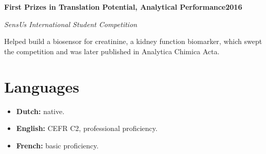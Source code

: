 \documentclass[10pt]{scrartcl}
\newcommand{\cventry}[4]{%
    \needspace{5\baselineskip}%
    {\large\textbf{#1}}\hfill\textbf{#3}\par
    \textit{#2}\par
    \smallskip
    #4\par
    \medskip
}
\begin{document}
\cventry
    {First Prizes in Translation Potential, Analytical Performance}
    {SensUs International Student Competition}
    {2016}
    {Helped build a biosensor for creatinine, a kidney function biomarker, which swept the competition and was later published in Analytica Chimica Acta.}

\section{Languages}

\begin{itemize}
    \item \textbf{Dutch:} native.
    \item \textbf{English:} CEFR C2, professional proficiency.
    \item \textbf{French:} basic proficiency.
\end{itemize}
\end{document}
